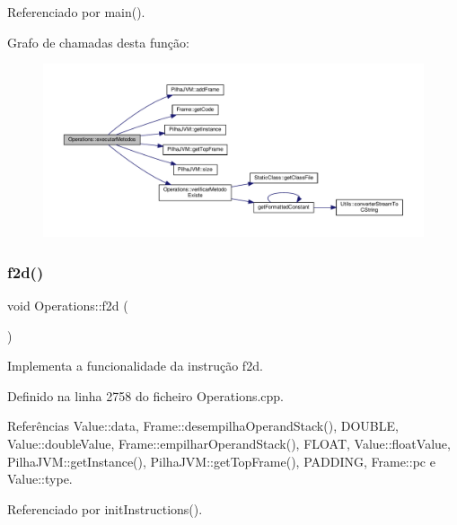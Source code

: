 Referenciado por main().

Grafo de chamadas desta função\+:\nopagebreak
\begin{figure}[H]
\begin{center}
\leavevmode
\includegraphics[width=350pt]{classOperations_ab771bdb83af6f55d93d126b944d4e73b_cgraph}
\end{center}
\end{figure}
\mbox{\label{classOperations_afb29ca09bc75d3342920b1509aba3635}} 
\subsubsection{\texorpdfstring{f2d()}{f2d()}}
{\footnotesize\ttfamily void Operations\+::f2d (\begin{DoxyParamCaption}{ }\end{DoxyParamCaption})\hspace{0.3cm}{\ttfamily [private]}}



Implementa a funcionalidade da instrução f2d. 



Definido na linha 2758 do ficheiro Operations.\+cpp.



Referências Value\+::data, Frame\+::desempilha\+Operand\+Stack(), D\+O\+U\+B\+LE, Value\+::double\+Value, Frame\+::empilhar\+Operand\+Stack(), F\+L\+O\+AT, Value\+::float\+Value, Pilha\+J\+V\+M\+::get\+Instance(), Pilha\+J\+V\+M\+::get\+Top\+Frame(), P\+A\+D\+D\+I\+NG, Frame\+::pc e Value\+::type.



Referenciado por init\+Instructions().

